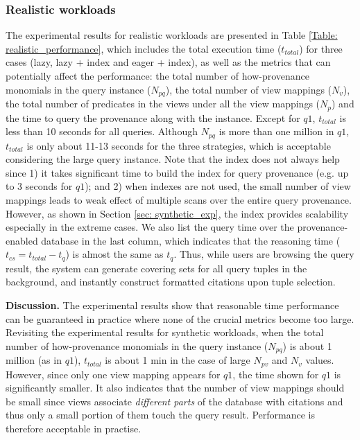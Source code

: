 \subsubsection{Realistic workloads}
\label{ssec: realistic}
The experimental results for realistic workloads are presented in Table \ref{Table: realistic_performance}, which includes the total execution time ($t_{total}$) for three cases (lazy, lazy + index and eager + index), as well as the metrics that can potentially affect the performance: the total number of how-provenance monomials in the query instance ($N_{pq}$), the total number of view mappings ($N_v$), the total number of predicates in the views under all the view mappings ($N_p$) and the time to query the provenance along with the instance. Except for $q1$, $t_{total}$ is less than 10 seconds for all queries. Although $N_{pq}$ is more than one million in $q1$, $t_{total}$ is only about 11-13 seconds for the three strategies, which is acceptable considering the large query instance. Note that the index does not always help since 1) it takes significant time to build the index for query provenance (e.g. up to 3 seconds for $q1$); and 2) when indexes are not used, the small number of view mappings leads to weak effect of multiple scans over the entire query provenance. 
However, as shown in Section \ref{sec: synthetic_exp}, the index provides  scalability especially in the extreme cases. We also list the query time over the provenance-enabled database in the last column, which indicates that the reasoning time ($t_{cs} = t_{total} - t_{q}$) is almost the same as $t_{q}$. Thus, while users are browsing the query result, the system can generate covering sets for all query tuples in the background, and instantly construct formatted citations upon tuple selection.


{\bf Discussion.} The experimental results show that reasonable time performance can be guaranteed in practice where none of the crucial metrics become too large.  Revisiting the experimental results for synthetic workloads, when the total number of how-provenance monomials in the query instance ($N_{pq}$) is about 1 million (as in $q1$), $t_{total}$ is about 1 min in the case of large $N_{pv}$ and $N_v$ values. However, since only one view mapping appears for $q1$, the time shown for $q1$ is  significantly smaller.  It also indicates that the number of view mappings should be small since views associate \textit{different parts} of the database with citations and thus only a small portion of them touch the query result. Performance is therefore acceptable in practise.